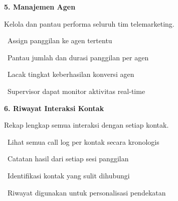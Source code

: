 \documentclass[a4paper]{article}
\begin{document}
\vspace{8pt}

\noindent
\begin{minipage}[t]{0.485\textwidth}
    \colorbox{OrangePrimary}{%
        \begin{minipage}{\dimexpr\textwidth-14pt}
            \vspace{5pt}
            {\fontsize{10}{13}\selectfont\bfseries\color{White} 5. Manajemen Agen}
            \vspace{5pt}
        \end{minipage}}
    \vspace{5pt}
    {\fontsize{9}{12}\selectfont\color{TextDark}%
    Kelola dan pantau performa seluruh tim telemarketing.\par\vspace{3pt}
    \textbullet\ Assign panggilan ke agen tertentu\par\vspace{2pt}%
    \textbullet\ Pantau jumlah dan durasi panggilan per agen\par\vspace{2pt}%
    \textbullet\ Lacak tingkat keberhasilan konversi agen\par\vspace{2pt}%
    \textbullet\ Supervisor dapat monitor aktivitas real-time}%
\end{minipage}%
\hfill
\begin{minipage}[t]{0.485\textwidth}
    \colorbox{CrimsonDark}{%
        \begin{minipage}{\dimexpr\textwidth-14pt}
            \vspace{5pt}
            {\fontsize{10}{13}\selectfont\bfseries\color{White} 6. Riwayat Interaksi Kontak}
            \vspace{5pt}
        \end{minipage}}
    \vspace{5pt}
    {\fontsize{9}{12}\selectfont\color{TextDark}%
    Rekap lengkap semua interaksi dengan setiap kontak.\par\vspace{3pt}
    \textbullet\ Lihat semua call log per kontak secara kronologis\par\vspace{2pt}%
    \textbullet\ Catatan hasil dari setiap sesi panggilan\par\vspace{2pt}%
    \textbullet\ Identifikasi kontak yang sulit dihubungi\par\vspace{2pt}%
    \textbullet\ Riwayat digunakan untuk personalisasi pendekatan}%
\end{minipage}
\end{document}
